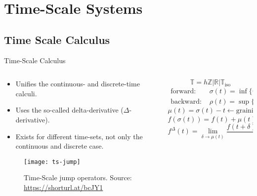 
\section{Time-Scale Systems}%
\label{sec:ts-systems}

\subsection{Time Scale Calculus}%
\label{subsec:ts-calculus}

\begin{slide}{Time-Scale Calculus}
  \begin{columns}[c]
    \begin{column}{0.48\textwidth}
      \begin{itemize}
        \item Unifies the continuous- and discrete-time calculi.
        \item Uses the so-called delta-derivative (\(\Delta\)-derivative).
        \item Exists for different time-sets, not only the continuous and
              discrete case.
      \end{itemize}
      \begin{figure}[ht!]
        \centering
        \texttt{[image: ts-jump]}
        \caption{Time-Scale jump operators. Source: \url{https://shorturl.at/bcJY1}}%
      \end{figure}
    \end{column}%
    \hfill%
    \begin{column}{0.48\textwidth}
      \begin{equation}
        \mathbb{T} = h\mathbb{Z} | \mathbb{R} | \mathbb{T}_{\textrm{iso}}
      \end{equation}
      \begin{align}
        \textrm{forward:~}  & \sigma(t) = \inf\{\tau\in\mathbb{T}|\tau>t\}, \\
        \textrm{backward:~} & \rho(t) = \sup\{\tau\in\mathbb{T}|\tau<t\}.
      \end{align}
      \begin{equation}
        \mu(t) = \sigma(t)-t \leftarrow \textrm{graininess}
      \end{equation}
      \begin{equation}
        f(\sigma(t)) = f(t) + \mu(t)f^{\Delta}(t).
      \end{equation}
      \begin{equation}
        f^{\Delta}(t) = \lim_{\delta\rightarrow{}\mu(t)}\frac{f(t+\delta)-f(t)}{\delta}.
      \end{equation}
    \end{column}%
  \end{columns}
\end{slide}


